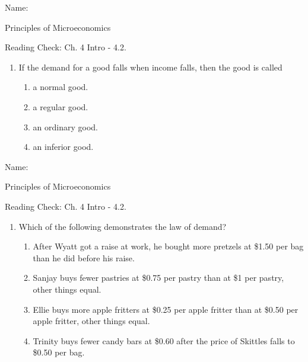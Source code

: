 \documentclass{article}
\begin{document}
\bigskip

Name: \underline{\phantom{xxxxxxxxxxxxxxxxxxxx}}

Principles of Microeconomics

Reading Check: Ch. 4 Intro - 4.2.

\begin{enumerate}

\item If the demand for a good falls when income falls, then the good is called

	\begin{enumerate}
	
	\item a normal good.
	
	\item a regular good.
	
	\item an ordinary good.
	
	\item an inferior good.
	
	\end{enumerate}

\end{enumerate}

\bigskip

Name: \underline{\phantom{xxxxxxxxxxxxxxxxxxxx}}

Principles of Microeconomics

Reading Check: Ch. 4 Intro - 4.2.

\begin{enumerate}

\item Which of the following demonstrates the law of demand?

	\begin{enumerate}
	
	\item After Wyatt got a raise at work, he bought more pretzels at \$1.50 per bag than he did before his raise.
	
	\item Sanjay buys fewer pastries at \$0.75 per pastry than at \$1 per pastry, other things equal.
	
	\item Ellie buys more apple fritters at \$0.25 per apple fritter than at \$0.50 per apple fritter, other things equal. 
	
	\item Trinity buys fewer candy bars at \$0.60 after the price of Skittles falls to \$0.50 per bag.
	
	\end{enumerate}

\end{enumerate}
\end{document}
